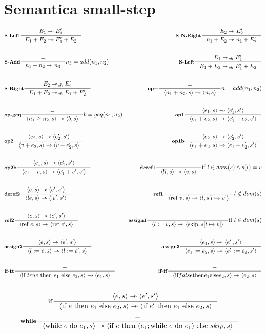 \documentclass[a4paper, 10pt]{article}
\newcommand{\infer}[4]{\inference[\textbf{#1}]{#2}{#3}#4 }
\newcommand{\srule}[2]{\langle #1 \rangle \rightarrowtriangle \langle #2 \rangle}
\newcommand{\memrep}[3]{#1 \lbrack #2 \mapsto #3 \rbrack}
\newcommand{\goesto}{\rightarrowtriangle}
\begin{document}
\section*{Semantica small-step}
	\begin{align*}
		&\infer{S-Left}{E_1 \goesto E_1' }{E_1 + E_2 \goesto E_1' + E_2}{} 
		&\infer{S-N.Right}{E_2 \goesto E_2'}{n_1 + E_2 \goesto n_1 + E_2'}{} \\ \\
		&\infer{S-Add}{-}{n_1+n_2 \goesto n_3}{n_3 = add(n_1, n_2)} 
		&\infer{S-Left}{E_1 \goesto_{ch} E_1'}{E_1 + E_2 \goesto_{ch} E_1' + E_2}{}\\ \\
		&\infer{S-Right}{E_2 \goesto_{ch} E_2'}{E_1 + E_2 \goesto_{ch} E_1 + E_2'}{}
		&\infer{op+}{-}{\srule{n_1 + n_2,s}{n,s}}{n=add(n_1,n_2)}\\ \\
		&\infer{op-geq}{-}{\srule{n_1 \geq n_2,s}{b,s}}{b=geq(n_1, n_2)} 
		&\infer{op1}{\srule{e_1,s}{e_1', s'}}{\srule{e_1 + e_2,s}{e_1' + e_2,s'}}{} \\ \\
		&\infer{op2}{\srule{e_2,s}{e_2', s'}}{\srule{v + e_2,s}{v + e_2',s}}{} 
		&\infer{op1b}{\srule{e_2,s}{e_2', s'}}{\srule{e_1 + e_2,s}{e_1 + e_2',s'}}{} \\ \\
		&\infer{op2b}{\srule{e_1,s}{e_1', s'}}{\srule{e_1 + v,s}{e_1' + v',s'}}{} 
		&\infer{deref1}{-}{\srule{!l,s}{v,s}}{\text{if } l \in dom(s) \wedge s(l)=v} \\ \\
		&\infer{deref2}{\srule{e,s}{e',s'}}{\srule{!e,s}{!e',s'}}{} 
		&\infer{ref1}{-}{\srule{\text{ref }v, s}{l, \memrep{s}{l}{v}}}{l \notin dom(s)} \\ \\
		&\infer{ref2}{\srule{e,s}{e',s'}}{\srule{\text{ref }e,s}{\text{ref } e',s}}{} 
		&\infer{assign1}{-}{\srule{l:=v,s}{\text{skip}, \memrep{s}{l}{v}}}{\text{if } l \in dom(s)}	 \\ \\
		&\infer{assign2}{\srule{e,s}{e',s'}}{\srule{l:=e,s}{l:=e',s}}{} 
		&\infer{assign3}{\srule{e_1,s}{e_1',s'}}{\srule{e_1:=e_2,s}{e_1':=e_2,s'}}{}\\ \\
		&\infer{if-tt}{-}{\srule{\text{if } true \text{ then } e_1 \text{ else } e_2,s}{e_1,s}}{}
		&\infer{if-ff}{-}{\srule{\text{if} false \text{then} e_1 \text{else} e_2,s}{e_2,s}}{} \\ \\
		\end{align*}
		\begin{align*}
		\infer{if}{\srule{e,s}{e',s'}}{\srule{\text{if } e \text{ then } e_1 \text{ else } e_2,s}{\text{if } e' \text{ then } e_1 \text{ else } e_2,s}}{}
		\end{align*}
		\begin{align*}
			&\infer{while}{-}{\srule{\text{while } e \text{ do } e_1, s}{\text{if } e \text{ then } (e_1; \text{while } e \text{ do } e_1) \text{ else } skip, s}}{}
		\end{align*}
		
\end{document}
